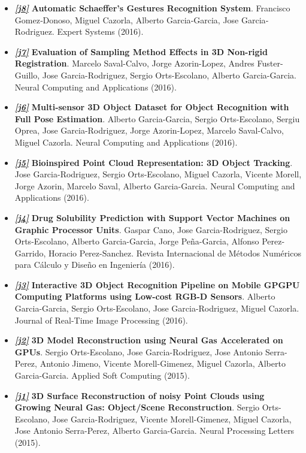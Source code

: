 \documentclass[8pt]{article}
\begin{document}
\begin{itemize}
    \item \emph{\textbf{\href{http://onlinelibrary.wiley.com/doi/10.1111/exsy.12160/abstract}{[j8]}}} \textbf{Automatic Schaeffer's Gestures Recognition System}. Francisco Gomez‐Donoso, Miguel Cazorla, Alberto Garcia‐Garcia, Jose Garcia‐Rodriguez. Expert Systems (2016).
    \item \emph{\textbf{\href{http://link.springer.com/article/10.1007/s00521-016-2258-z}{[j7]}}} \textbf{Evaluation of Sampling Method Effects in 3D Non-rigid Registration}. Marcelo Saval-Calvo, Jorge Azorin-Lopez, Andres Fuster-Guillo, Jose Garcia-Rodriguez, Sergio Orts-Escolano, Alberto Garcia-Garcia. Neural Computing and Applications (2016).
    \item \emph{\textbf{\href{http://link.springer.com/article/10.1007/s00521-016-2224-9}{[j6]}}} \textbf{Multi-sensor 3D Object Dataset for Object Recognition with Full Pose Estimation}. Alberto Garcia-Garcia, Sergio Orts-Escolano, Sergiu Oprea, Jose Garcia-Rodriguez, Jorge Azorin-Lopez, Marcelo Saval-Calvo, Miguel Cazorla. Neural Computing and Applications (2016).
    \item \emph{\textbf{\href{http://link.springer.com/article/10.1007/s00521-016-2585-0}{[j5]}}} \textbf{Bioinspired Point Cloud Representation: 3D Object Tracking}. Jose Garcia-Rodriguez, Sergio Orts-Escolano, Miguel Cazorla, Vicente Morell, Jorge Azorin, Marcelo Saval, Alberto Garcia-Garcia. Neural Computing and Applications (2016).
    \item \emph{\textbf{\href{http://www.sciencedirect.com/science/article/pii/S0213131516000067}{[j4]}}} \textbf{Drug Solubility Prediction with Support Vector Machines on Graphic Processor Units}. Gaspar Cano, Jose Garcia-Rodriguez, Sergio Orts-Escolano, Alberto Garcia-Garcia, Jorge Peña-Garcia, Alfonso Perez-Garrido, Horacio Perez-Sanchez. Revista Internacional de Métodos Numéricos para Cálculo y Diseño en Ingeniería (2016).
    \item \emph{\textbf{\href{http://link.springer.com/article/10.1007/s11554-016-0607-x}{[j3]}}} \textbf{Interactive 3D Object Recognition Pipeline on Mobile GPGPU Computing Platforms using Low-cost RGB-D Sensors}. Alberto Garcia-Garcia, Sergio Orts-Escolano, Jose Garcia-Rodriguez, Miguel Cazorla. Journal of Real-Time Image Processing (2016).
    \item \emph{\textbf{\href{http://www.sciencedirect.com/science/article/pii/S1568494615002008}{[j2]}}} \textbf{3D Model Reconstruction using Neural Gas Accelerated on GPUs}. Sergio Orts-Escolano, Jose Garcia-Rodriguez, Jose Antonio Serra-Perez, Antonio Jimeno, Vicente Morell-Gimenez, Miguel Cazorla, Alberto Garcia-Garcia. Applied Soft Computing (2015).
    \item \emph{\textbf{\href{http://link.springer.com/article/10.1007/s11063-015-9421-x}{[j1]}}} \textbf{3D Surface Reconstruction of noisy Point Clouds using Growing Neural Gas: Object/Scene Reconstruction}. Sergio Orts-Escolano, Jose Garcia-Rodriguez, Vicente Morell-Gimenez, Miguel Cazorla, Jose Antonio Serra-Perez, Alberto Garcia-Garcia. Neural Processing Letters (2015).
\end{itemize}
\end{document}
